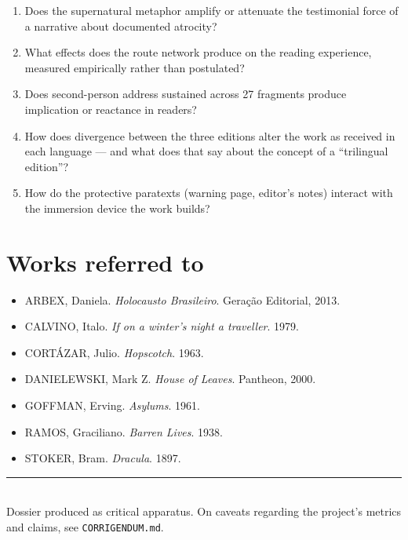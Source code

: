 \documentclass[11pt,a4paper]{article}
\begin{document}
\begin{enumerate}
\item Does the supernatural metaphor amplify or attenuate the testimonial
force of a narrative about documented atrocity?
\item What effects does the route network produce on the reading experience,
measured empirically rather than postulated?
\item Does second-person address sustained across 27 fragments produce
implication or reactance in readers?
\item How does divergence between the three editions alter the work as
received in each language --- and what does that say about the concept of a
``trilingual edition''?
\item How do the protective paratexts (warning page, editor's notes) interact
with the immersion device the work builds?
\end{enumerate}

\section*{Works referred to}

\begin{itemize}\small
\item ARBEX, Daniela. \textit{Holocausto Brasileiro}. Geração Editorial, 2013.
\item CALVINO, Italo. \textit{If on a winter's night a traveller}. 1979.
\item CORTÁZAR, Julio. \textit{Hopscotch}. 1963.
\item DANIELEWSKI, Mark Z. \textit{House of Leaves}. Pantheon, 2000.
\item GOFFMAN, Erving. \textit{Asylums}. 1961.
\item RAMOS, Graciliano. \textit{Barren Lives}. 1938.
\item STOKER, Bram. \textit{Dracula}. 1897.
\end{itemize}

\vfill
\noindent\rule{\linewidth}{0.4pt}\\
{\footnotesize Dossier produced as critical apparatus. On caveats regarding
the project's metrics and claims, see \texttt{CORRIGENDUM.md}.}
\end{document}
